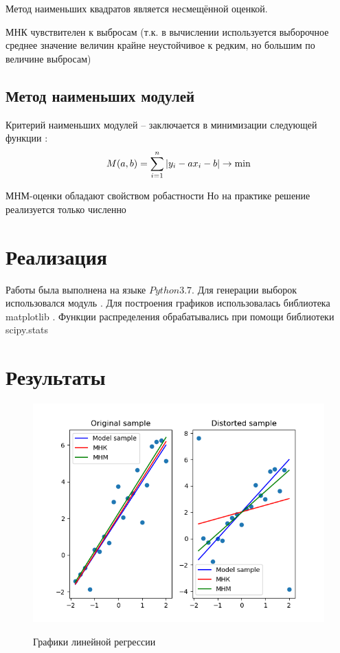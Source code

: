\documentclass[a4]{article}
\begin{document}
Метод наименьших квадратов является несмещённой оценкой.

МНК чувствителен к выбросам (т.к. в вычислении используется выборочное среднее значение величин крайне неустойчивое к редким, но большим по величине выбросам)

\subsection{Метод наименьших модулей}
Критерий наименьших модулей – заключается в минимизации следующей функции \cite{6_4}:
\begin{equation}
    M(a,b) = \sum\limits_{i=1}^n\vert y_i-ax_i-b\vert\to\min\hfill
\end{equation}

МНМ-оценки обладают свойством робастности
Но на практике решение реализуется только численно

\section{Реализация}
Работы была выполнена на языке $Python 3.7.$
Для генерации выборок использовался модуль \cite{numpy}.
Для построения графиков использовалась библиотека matplotlib \cite{plotlib}.
Функции распределения обрабатывались при помощи библиотеки scipy.stats \cite{skp}

\section{Результаты}

\begin{figure}[H]
    \centering
    \caption{Графики линейной регрессии}
    \includegraphics[scale = 0.8]{reg.png} 
    \label{fig:reg}
\end{figure}
\end{document}
